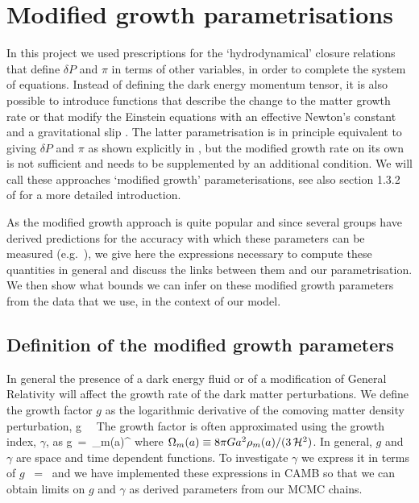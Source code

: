 \section{Modified growth parametrisations}
\label{chapter-ade:growth}

In this project we used prescriptions for the `hydrodynamical' closure relations that define $\delta P$ and $\pi$ in terms of
other variables, in order to complete the system of equations. Instead of defining the dark energy momentum tensor, it is also
possible to introduce functions that describe the change to the matter growth rate \cite{Amendola:2004wa,Linder:2005in} or that modify the
Einstein equations with an effective Newton's constant and a gravitational slip \cite{Amendola:2007rr}. The latter
parametrisation is in principle equivalent to giving $\delta P$ and $\pi$ as shown explicitly
in \cite{Ballesteros:2011cm}, but the modified growth rate on its own is not sufficient and needs to be supplemented 
by an additional condition. We will call these approaches `modified growth' parameterisations, see also section 1.3.2
of \cite{Amendola:2012ys} for a more detailed introduction.

As the modified growth approach is quite popular and since several groups have derived predictions for the accuracy
with which these parameters can be measured (e.g.\ \cite{Amendola:2007rr,Pogosian:2010tj,Bean:2010zq}), we give here the expressions necessary to compute these
quantities in general and discuss the links between them and our parametrisation. We then show what bounds we
can infer on these modified growth parameters from the data that we use, in the context of our model.

\subsection{Definition of the modified growth parameters}

In general the presence of a dark energy fluid or of a modification of General Relativity will affect the growth rate of the
dark matter perturbations.
We define the growth factor $g$ as the logarithmic derivative of the comoving matter density perturbation,
\be
  g\ \equiv\ 
\ee
The growth factor is often approximated using the growth index, $\gamma$, as
\be
  g\ =\ \Omega_m(a)^\gamma
\ee
where $\Omega_m(a)\equiv 8\pi Ga^2\rho_m(a)/(3\,{\mathcal H}^2)$. In general, $g$ and $\gamma$ are space and time dependent functions. To investigate $\gamma$ we express it in terms of $g$
\be
  \gamma\ =\ 
\ee
and we have implemented these expressions in CAMB so that we can obtain limits on $g$ and $\gamma$
as derived parameters from our MCMC chains.

